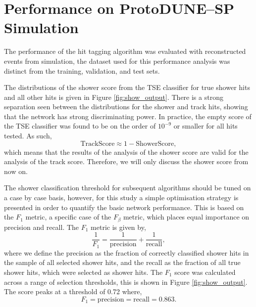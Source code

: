 \section{Performance on ProtoDUNE--SP Simulation} \label{cnn-perf-sim}

The performance of the hit tagging algorithm was evaluated with reconstructed
events from \protodune{} simulation, the dataset used for this performance
analysis was distinct from the training, validation, and test sets. 

The distributions of the shower score from the TSE classifier for true shower 
hits and all other hits is given in Figure \ref{fig:show_output}. There is a 
strong separation seen between the distributions for the shower and track 
hits, showing that the network has strong discriminating power. In practice, the
empty score of the TSE classifier was found to be on the order of $10^{-9}$ or
smaller for all hits tested. As such,
\begin{equation*}
	\mbox{TrackScore} \approx 1 - \mbox{ShowerScore},
\end{equation*}
which means that the results of the analysis of the shower score are valid for
the analysis of the track score. Therefore, we will only discuss the shower
score from now on.

The shower classification threshold for subsequent algorithms should be tuned on
a case by case basis, however, for this study a simple optimisation strategy 
is presented in order to quantify the basic network performance. This is based
on the $F_1$ metric, a specific case of the $F_\beta$ 
metric\cite{VanRijsbergenC.J.1975Ir}, which places equal importance on 
precision and recall. The $F_1$ metric is given by, 
\begin{equation*}
	\frac{1}{F_1} = \frac{1}{\mbox{precision}} + \frac{1}{\mbox{recall}},
\end{equation*}
where we define the precision as the fraction of correctly classified shower 
hits in the sample of all selected shower hits, and the recall as the fraction 
of all true shower hits, which were selected as shower hits. The $F_1$ score 
was calculated across a range of selection thresholds, this is shown in Figure 
\ref{fig:show_output}. The score peaks at a threshold of 0.72 where,
\begin{equation*}
	F_1 = \mbox{precision} = \mbox{recall} = 0.863.
\end{equation*}

